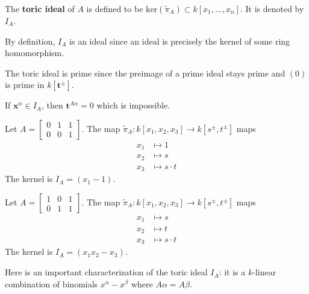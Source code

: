 \documentclass[a4paper, 11pt]{article}
\begin{document}
\begin{defi}
  The \textbf{toric ideal} of \( A \) is defined to be \( \mathrm{ker}(\tilde \pi_A) \subset k[x_1,...,x_n]  \). It is denoted by \( I_A \).
\end{defi}

By definition, \( I_A \) is an ideal since an ideal is precisely the kernel of some ring homomorphism.

\begin{remark}
  The toric ideal is prime since the preimage of a prime ideal stays prime and \( (0) \) is prime in \( k[\mathbf t^{\pm}] \).
\end{remark}

\begin{remark}
  If \( \mathbf x^\alpha \in I_A \), then \( \mathbf t^{A\alpha} = 0 \) which is impossible.
\end{remark}


\begin{eg}
  Let \( A = \begin{bmatrix}
    0 & 1 & 1 \\
    0 & 0 & 1
  \end{bmatrix} \). The map \( \tilde \pi_A : k[x_1,x_2,x_3] \to k[s^{\pm}, t^{\pm}] \) maps 
  \begin{align*}
    x_1 &\mapsto 1\\
    x_2 &\mapsto s\\
    x_3 &\mapsto s \cdot t
  \end{align*}
  The kernel is \( I_A = (x_1 - 1) \).
\end{eg}

\begin{eg}
  Let \( A = \begin{bmatrix}
    1 & 0 & 1 \\
    0 & 1 & 1
  \end{bmatrix} \). The map \( \tilde \pi_A : k[x_1,x_2,x_3] \to k[s^{\pm}, t^{\pm}] \) maps 
  \begin{align*}
    x_1 &\mapsto s\\
    x_2 &\mapsto t\\
    x_3 &\mapsto s \cdot t
  \end{align*}
  The kernel is \( I_A = (x_1x_2 - x_3) \).
\end{eg}


Here is an important characterization of the toric ideal \( I_A \): it is a \( k \)-linear combination of binomials \( x^{\alpha} - x^{\beta} \) where \( A\alpha = A\beta \).
\end{document}
